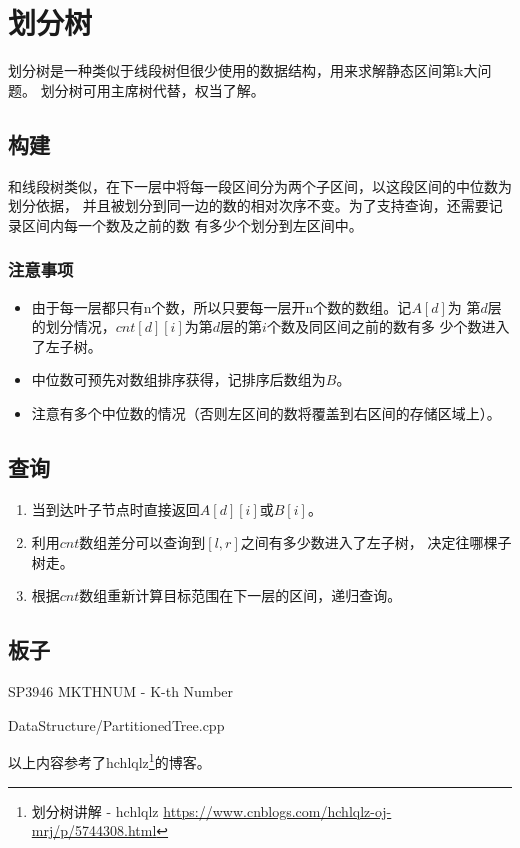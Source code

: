 \section{划分树}
划分树是一种类似于线段树但很少使用的数据结构，用来求解静态区间第k大问题。
划分树可用主席树代替，权当了解。
\subsection{构建}
和线段树类似，在下一层中将每一段区间分为两个子区间，以这段区间的中位数为划分依据，
并且被划分到同一边的数的相对次序不变。为了支持查询，还需要记录区间内每一个数及之前的数
有多少个划分到左区间中。
\subsubsection{注意事项}
\begin{itemize}
    \item 由于每一层都只有n个数，所以只要每一层开n个数的数组。记$A[d]$为
    第$d$层的划分情况，$cnt[d][i]$为第$d$层的第$i$个数及同区间之前的数有多
    少个数进入了左子树。
    \item 中位数可预先对数组排序获得，记排序后数组为$B$。
    \item 注意有多个中位数的情况（否则左区间的数将覆盖到右区间的存储区域上）。
\end{itemize}
\subsection{查询}

\begin{enumerate}
    \item 当到达叶子节点时直接返回$A[d][i]$或$B[i]$。
    \item 利用$cnt$数组差分可以查询到$[l,r]$之间有多少数进入了左子树，
    决定往哪棵子树走。
    \item 根据$cnt$数组重新计算目标范围在下一层的区间，递归查询。
\end{enumerate}

\subsection{板子}

SP3946 MKTHNUM - K-th Number


{DataStructure/PartitionedTree.cpp}

以上内容参考了hchlqlz\footnote{划分树讲解 - hchlqlz
\url{https://www.cnblogs.com/hchlqlz-oj-mrj/p/5744308.html}}的博客。

